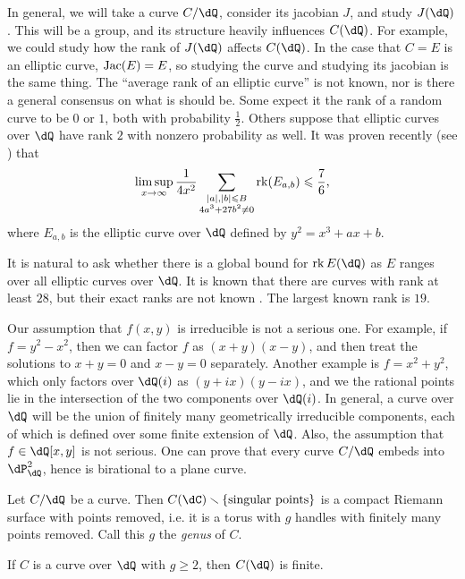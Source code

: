 \documentclass{article}
\begin{document}
In general, we will take a curve $C/\dQ$, consider its jacobian $J$, and study 
$J(\dQ)$. This will be a group, and its structure heavily influences $C(\dQ)$. 
For example, we could study how the rank of $J(\dQ)$ affects $C(\dQ)$. In the 
case that $C=E$ is an elliptic curve, $\operatorname{Jac}(E)=E$, so studying the curve and 
studying its jacobian is the same thing. The ``average rank of an elliptic 
curve'' is not known, nor is there a general consensus on what is should be. 
Some expect it the rank of a random curve to be $0$ or $1$, both with 
probability $\frac 1 2$. Others suppose that elliptic curves over $\dQ$ have 
rank $2$ with nonzero probability as well. It was proven recently (see 
\cite[\S 1]{bh10}) that 
\[
  \limsup_{x\to\infty} \frac{1}{4 x^2} \sum_{\substack{|a|,|b|\leqslant B \\ 4 a^3+27 b^2\ne 0}} \operatorname{rk}(E_{a,b}) \leqslant\frac 7 6 \text{,}
\]
where $E_{a,b}$ is the elliptic curve over $\dQ$ defined by $y^2=x^3 +a x+b$.

It is natural to ask whether there is a global bound for $\rank E(\dQ)$ as 
$E$ ranges over all elliptic curves over $\dQ$. 
It is known that there are curves with rank at least $28$, but their exact 
ranks are not known \cite{du}. The largest known rank is $19$. 

Our assumption that $f(x,y)$ is irreducible is not a serious one. For example, 
if $f=y^2-x^2$, then we can factor $f$ as $(x+y)(x-y)$, and then treat the 
solutions to $x+y=0$ and $x-y=0$ separately. Another example is $f=x^2+y^2$, 
which only factors over $\dQ(i)$ as $(y+i x)(y-i x)$, and we the rational 
points lie in the intersection of the two components over $\dQ(i)$. In general, 
a curve over $\dQ$ will be the union of finitely many geometrically irreducible 
components, each of which is defined over some finite extension of $\dQ$. Also, 
the assumption that $f\in \dQ[x,y]$ is not serious. One can prove that every 
curve $C/\dQ$ embeds into $\dP^2_\dQ$, hence is birational to a plane curve. 

Let $C/\dQ$ be a curve. Then 
$C(\dC)\smallsetminus \{\text{singular points}\}$ is a compact Riemann 
surface with points removed, i.e. it is a torus with $g$ handles with finitely 
many points removed. Call this $g$ the \emph{genus} of $C$. 

\begin{theorem}
If $C$ is a curve over $\dQ$ with $g\geqslant 2$, then $C(\dQ)$ 
is finite. 
\end{theorem}
\end{document}
